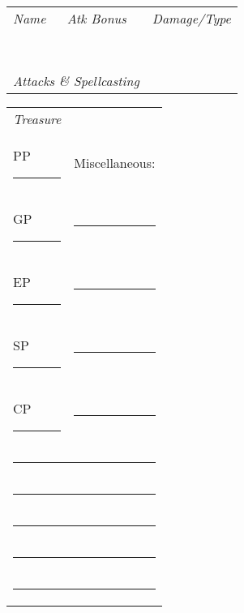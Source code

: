 \documentclass{article}
\begin{document}
\begin{minipage}{.3\textwidth}
   \begin{tabular}{|m{}m{}m{}|}
     \hline
     \textit{\footnotesize{Name}} & \textit{\footnotesize{Atk Bonus}} & \textit{\footnotesize{Damage/Type}}\\
     &&\\&&\\&&\\&&\\&&\\&&\\&&\\&&\\
     \multicolumn{2}{|l}{\textit{\footnotesize{Attacks \& Spellcasting}}}&\\
     \hline
   \end{tabular}

   \begin{tabular}{|ll|}
     \hline
     \textit{\footnotesize{Treasure}}&\\
     PP \rule{.5in}{.2pt} &Miscellaneous:\\
     GP \rule{.5in}{.2pt} &\rule{1.3in}{.2pt}\\
     EP \rule{.5in}{.2pt} &\rule{1.3in}{.2pt}\\
     SP \rule{.5in}{.2pt} &\rule{1.3in}{.2pt}\\
     CP \rule{.5in}{.2pt} &\rule{1.3in}{.2pt}\\
     \multicolumn{2}{|l|}{\rule{2.2in}{.2pt}}\\
     \multicolumn{2}{|l|}{\rule{2.2in}{.2pt}}\\
     \multicolumn{2}{|l|}{\rule{2.2in}{.2pt}}\\
     \multicolumn{2}{|l|}{\rule{2.2in}{.2pt}}\\
     \multicolumn{2}{|l|}{\rule{2.2in}{.2pt}}\\
     \hline
   \end{tabular}
 \end{minipage} %
\end{document}
